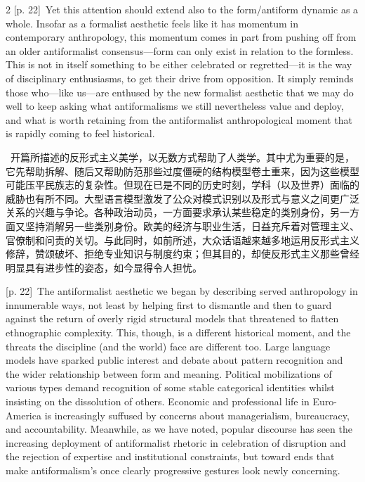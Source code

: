 \documentclass[10pt,a4paper]{article}
\begin{document}
\begin{paracol}{2}
\switchcolumn
{\scriptsize\color{gray} [p. 22]}\ Yet this attention should extend also to the form/antiform dynamic as a whole. Insofar as a formalist aesthetic feels like it has momentum in contemporary anthropology, this momentum comes in part from pushing off from an older antiformalist consensus—form can only exist in relation to the formless. This is not in itself something to be either celebrated or regretted—it is the way of disciplinary enthusiasms, to get their drive from opposition. It simply reminds those who—like us—are enthused by the new formalist aesthetic that we may do well to keep asking what antiformalisms we still nevertheless value and deploy, and what is worth retaining from the antiformalist anthropological moment that is rapidly coming to feel historical.\par
\switchcolumn*
{\scriptsize\color{gray} [p. 22]}\ 开篇所描述的反形式主义美学，以无数方式帮助了人类学。其中尤为重要的是，它先帮助拆解、随后又帮助防范那些过度僵硬的结构模型卷土重来，因为这些模型可能压平民族志的复杂性。但现在已是不同的历史时刻，学科（以及世界）面临的威胁也有所不同。大型语言模型激发了公众对模式识别以及形式与意义之间更广泛关系的兴趣与争论。各种政治动员，一方面要求承认某些稳定的类别身份，另一方面又坚持消解另一些类别身份。欧美的经济与职业生活，日益充斥着对管理主义、官僚制和问责的关切。与此同时，如前所述，大众话语越来越多地运用反形式主义修辞，赞颂破坏、拒绝专业知识与制度约束；但其目的，却使反形式主义那些曾经明显具有进步性的姿态，如今显得令人担忧。\par
\switchcolumn
{\scriptsize\color{gray} [p. 22]}\ The antiformalist aesthetic we began by describing served anthropology in innumerable ways, not least by helping first to dismantle and then to guard against the return of overly rigid structural models that threatened to flatten ethnographic complexity. This, though, is a different historical moment, and the threats the discipline (and the world) face are different too. Large language models have sparked public interest and debate about pattern recognition and the wider relationship between form and meaning. Political mobilizations of various types demand recognition of some stable categorical identities whilst insisting on the dissolution of others. Economic and professional life in Euro-America is increasingly suffused by concerns about managerialism, bureaucracy, and accountability. Meanwhile, as we have noted, popular discourse has seen the increasing deployment of antiformalist rhetoric in celebration of disruption and the rejection of expertise and institutional constraints, but toward ends that make antiformalism’s once clearly progressive gestures look newly concerning.\par

\end{paracol}
\end{document}
